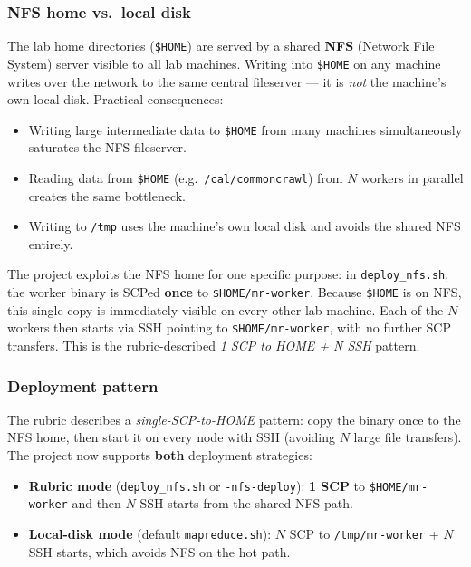 \documentclass[11pt,a4paper]{article}
\begin{document}
\subsubsection{NFS home vs.\ local disk}
\label{sec:nfs}

The lab home directories (\texttt{\$HOME}) are served by a shared
\textbf{NFS} (Network File System) server visible to all lab machines.
Writing into \texttt{\$HOME} on any machine writes over the network to the
same central fileserver — it is \emph{not} the machine's own local disk.
Practical consequences:
\begin{itemize}[leftmargin=1.5em]
  \item Writing large intermediate data to \texttt{\$HOME} from many machines
  simultaneously saturates the NFS fileserver.
  \item Reading data from \texttt{\$HOME} (e.g.\ \texttt{/cal/commoncrawl})
  from \(N\) workers in parallel creates the same bottleneck.
  \item Writing to \texttt{/tmp} uses the machine's own local disk and avoids
  the shared NFS entirely.
\end{itemize}

The project exploits the NFS home for one specific purpose: in
\texttt{deploy\_nfs.sh}, the worker binary is SCPed \textbf{once} to
\texttt{\$HOME/mr-worker}. Because \texttt{\$HOME} is on NFS, this single copy
is immediately visible on every other lab machine. Each of the $N$ workers then
starts via SSH pointing to \texttt{\$HOME/mr-worker}, with no further SCP
transfers. This is the rubric-described \emph{1 SCP to HOME + N SSH} pattern.

\subsubsection{Deployment pattern}

The rubric describes a \emph{single-SCP-to-HOME} pattern: copy the binary once
to the NFS home, then start it on every node with SSH (avoiding \(N\) large
file transfers). The project now supports \textbf{both} deployment strategies:

\begin{itemize}[leftmargin=1.5em]
  \item \textbf{Rubric mode} (\texttt{deploy\_nfs.sh} or \texttt{-nfs-deploy}):
  \textbf{1 SCP} to \texttt{\$HOME/mr-worker} and then \(N\) SSH starts from the
  shared NFS path.
  \item \textbf{Local-disk mode} (default \texttt{mapreduce.sh}): \(N\) SCP to
  \texttt{/tmp/mr-worker} + \(N\) SSH starts, which avoids NFS on the hot path.
\end{itemize}
\end{document}
